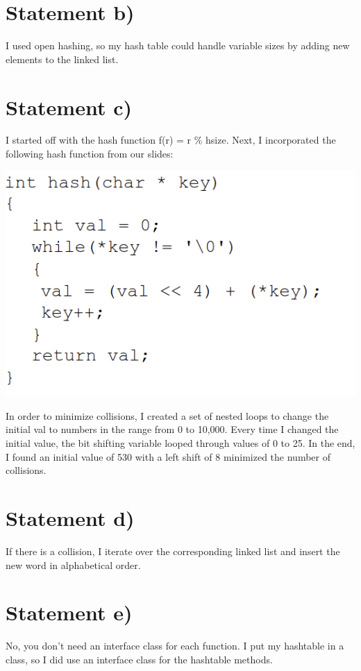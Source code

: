 \documentclass[11pt]{article}
\begin{document}
\section*{Statement b)}
I used open hashing, so my hash table could handle variable sizes by adding new elements to the linked list.

\section*{Statement c)}
I started off with the hash function f(r) = r \% hsize. Next, I incorporated the following hash function from our slides:

\begin{center}
\includegraphics[keepaspectratio=true,scale=0.5]{slides-hash.png}
\end{center}

In order to minimize collisions, I created a set of nested loops to change the initial val to numbers in the range from 0 to 10,000. Every time I changed the initial value, the bit shifting variable looped through values of 0 to 25. In the end, I found an initial value of 530 with a left shift of 8 minimized the number of collisions.

\section*{Statement d)}
If there is a collision, I iterate over the corresponding linked list and insert the new word in alphabetical order.

\section*{Statement e)}
No, you don't need an interface class for each function. I put my hashtable in a class, so I did use an interface class for the hashtable methods.
\end{document}
